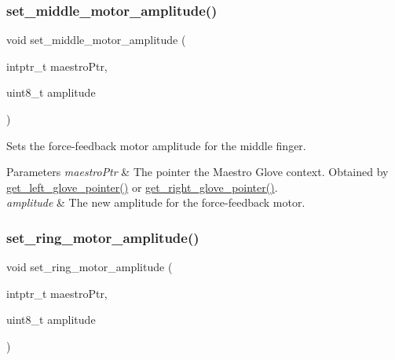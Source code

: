 \subsubsection{\texorpdfstring{set\+\_\+middle\+\_\+motor\+\_\+amplitude()}{set\_middle\_motor\_amplitude()}}
{\footnotesize\ttfamily void set\+\_\+middle\+\_\+motor\+\_\+amplitude (\begin{DoxyParamCaption}\item[{intptr\+\_\+t}]{maestro\+Ptr,  }\item[{uint8\+\_\+t}]{amplitude }\end{DoxyParamCaption})}

Sets the force-\/feedback motor amplitude for the middle finger. 
\begin{DoxyParams}{Parameters}
{\em maestro\+Ptr} & The pointer the Maestro Glove context. Obtained by \hyperlink{group__glove_management_ga63ce3c99d4a8b8db851b22af9185764e}{get\+\_\+left\+\_\+glove\+\_\+pointer()} or \hyperlink{group__glove_management_ga9b8fd9d91aeac3f8da50f7a7eba0c32b}{get\+\_\+right\+\_\+glove\+\_\+pointer()}. \\
\hline
{\em amplitude} & The new amplitude for the force-\/feedback motor. \\
\hline
\end{DoxyParams}
\mbox{\label{group__force_feedback_control_ga0e4501e2e7b288b6c99f19e3617308eb}} 
\subsubsection{\texorpdfstring{set\+\_\+ring\+\_\+motor\+\_\+amplitude()}{set\_ring\_motor\_amplitude()}}
{\footnotesize\ttfamily void set\+\_\+ring\+\_\+motor\+\_\+amplitude (\begin{DoxyParamCaption}\item[{intptr\+\_\+t}]{maestro\+Ptr,  }\item[{uint8\+\_\+t}]{amplitude }\end{DoxyParamCaption})}

